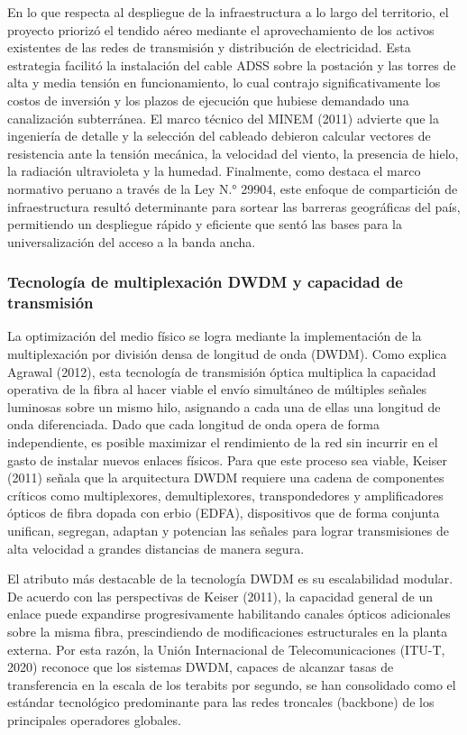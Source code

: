 En lo que respecta al despliegue de la infraestructura a lo largo del territorio, el proyecto priorizó el tendido aéreo mediante el aprovechamiento de los activos existentes de las redes de transmisión y distribución de electricidad. Esta estrategia facilitó la instalación del cable ADSS sobre la postación y las torres de alta y media tensión en funcionamiento, lo cual contrajo significativamente los costos de inversión y los plazos de ejecución que hubiese demandado una canalización subterránea. El marco técnico del MINEM (2011) advierte que la ingeniería de detalle y la selección del cableado debieron calcular vectores de resistencia ante la tensión mecánica, la velocidad del viento, la presencia de hielo, la radiación ultravioleta y la humedad. Finalmente, como destaca el marco normativo peruano a través de la Ley N.° 29904, este enfoque de compartición de infraestructura resultó determinante para sortear las barreras geográficas del país, permitiendo un despliegue rápido y eficiente que sentó las bases para la universalización del acceso a la banda ancha.
\subsubsection{Tecnología de multiplexación DWDM y capacidad de transmisión}
La optimización del medio físico se logra mediante la implementación de la multiplexación por división densa de longitud de onda (DWDM). Como explica Agrawal (2012), esta tecnología de transmisión óptica multiplica la capacidad operativa de la fibra al hacer viable el envío simultáneo de múltiples señales luminosas sobre un mismo hilo, asignando a cada una de ellas una longitud de onda diferenciada. Dado que cada longitud de onda opera de forma independiente, es posible maximizar el rendimiento de la red sin incurrir en el gasto de instalar nuevos enlaces físicos. Para que este proceso sea viable, Keiser (2011) señala que la arquitectura DWDM requiere una cadena de componentes críticos como multiplexores, demultiplexores, transpondedores y amplificadores ópticos de fibra dopada con erbio (EDFA), dispositivos que de forma conjunta unifican, segregan, adaptan y potencian las señales para lograr transmisiones de alta velocidad a grandes distancias de manera segura.

El atributo más destacable de la tecnología DWDM es su escalabilidad modular. De acuerdo con las perspectivas de Keiser (2011), la capacidad general de un enlace puede expandirse progresivamente habilitando canales ópticos adicionales sobre la misma fibra, prescindiendo de modificaciones estructurales en la planta externa. Por esta razón, la Unión Internacional de Telecomunicaciones (ITU-T, 2020) reconoce que los sistemas DWDM, capaces de alcanzar tasas de transferencia en la escala de los terabits por segundo, se han consolidado como el estándar tecnológico predominante para las redes troncales (backbone) de los principales operadores globales.

